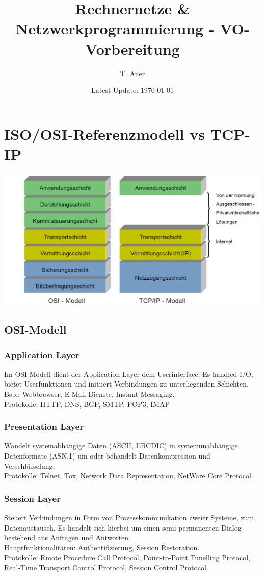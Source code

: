 \documentclass{article}
\title{Rechnernetze \& Netzwerkprogrammierung - VO-Vorbereitung}
\author{T. Auer} %
\date{Latest Update: \today}
\begin{document}
\maketitle
\hrulefill
\tableofcontents
\hrulefill
\newpage
    
\section{ISO/OSI-Referenzmodell vs TCP-IP}
    \begin{center}
        \includegraphics[width=\textwidth]{tcp_ip_model.png}
    \end{center}
    \subsection{OSI-Modell}
    \subsubsection{Application Layer}
    Im OSI-Modell dient der Application Layer dem Userinterface. Es handled I/O, bietet Userfunktionen und initiiert Verbindungen zu unterliegenden Schichten.
    Bsp.: Webbrowser, E-Mail Dienste, Instant Messaging.\\Protokolle: HTTP, DNS, BGP, SMTP, POP3, IMAP

    \subsubsection{Presentation Layer}
    Wandelt systemabhängige Daten (ASCII, EBCDIC) in systemunabhängige Datenformate (ASN.1) um oder behandelt Datenkompression und Verschlüsselung.\\Protokolle: Telnet, Tox, Network Data Representation, NetWare Core Protocol.

    \subsubsection{Session Layer}
    Steuert Verbindungen in Form von Prozesskommunikation zweier Systeme, zum Datenaustausch. Es handelt sich hierbei um einen semi-permanenten Dialog bestehend aus Anfragen und Antworten.\\Hauptfunktionalitäten: Authentifizierung, Session Restoration.\\Protokolle: Rmote Procedure Call Protocol, Point-to-Point Tunelling Protocol, Real-Time Transport Control Protocol, Session Control Protocol.
\end{document}
